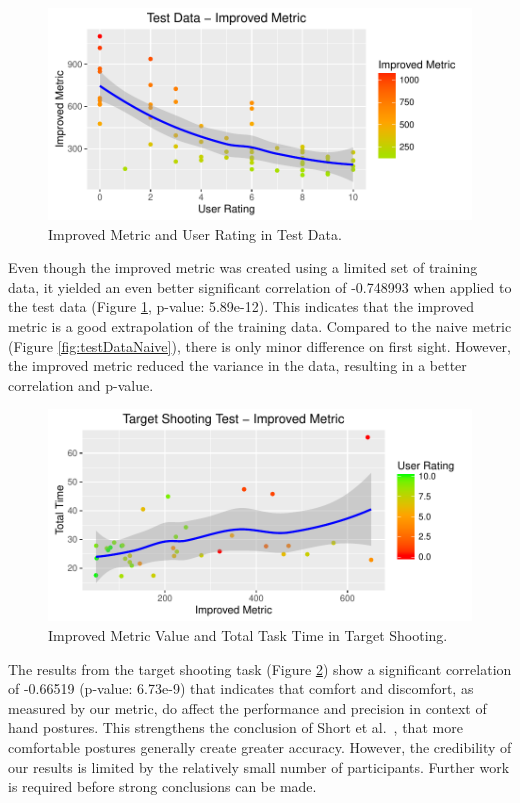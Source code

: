 \begin{figure}[h]
\centering
\includegraphics[width=\textwidth]{TestDataImproved}
\caption{Improved Metric and User Rating in Test Data.}
\label{fig:testData}
\end{figure}

Even though the improved metric was created using a limited set of training data, it yielded an even better significant correlation of -0.748993 when applied to the test data (Figure \ref{fig:testData}, p-value: 5.89e-12). This indicates that the improved metric is a good extrapolation of the training data. Compared to the naive metric (Figure \ref{fig:testDataNaive}), there is only minor difference on first sight. However, the improved metric reduced the variance in the data, resulting in a better correlation and p-value.

\begin{figure}[h]
\centering
\includegraphics[width=\textwidth]{TargetShooting}
\caption{Improved Metric Value and Total Task Time in Target Shooting.}
\label{fig:targetShooting}
\end{figure}

The results from the target shooting task (Figure \ref{fig:targetShooting}) show a significant correlation of -0.66519 (p-value: 6.73e-9) that indicates that comfort and discomfort, as measured by our metric, do affect the performance and precision in context of hand postures. This strengthens the conclusion of Short et al.~\cite{short1999precision}, that more comfortable postures generally create greater accuracy. However, the credibility of our results is limited by the relatively small number of participants. Further work is required before strong conclusions can be made.